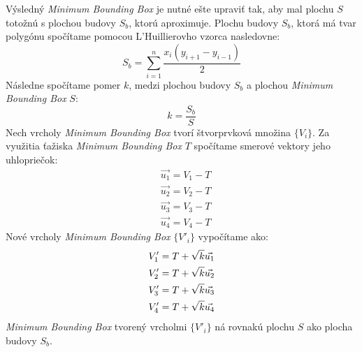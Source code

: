 \documentclass[11pt]{article}
\begin{document}
Výsledný \textit{Minimum Bounding Box} je nutné ešte upraviť tak, aby mal plochu $S$ totožnú s plochou budovy $S_b$, ktorú aproximuje. Plochu budovy $S_b$, ktorá má tvar polygónu spočítame pomocou L'Huillierovho vzorca nasledovne:
\begin{equation*}
S_b = \sum_{i=1}^{n} \frac{x_i(y_{i+1}-y_{i-1})}{2}
\end{equation*}
Následne spočítame pomer $k$, medzi plochou budovy $S_b$ a plochou \textit{Minimum Bounding Box} $S$:
\begin{equation*}
k = \frac{S_b}{S} 
\end{equation*}
Nech vrcholy \textit{Minimum Bounding Box} tvorí štvorprvková množina $\{V_i\}$. Za využitia ťažiska \textit{Minimum Bounding Box} $T$ spočítame smerové vektory jeho uhlopriečok:
\begin{align}
    \nonumber &\vec{u_1} = V_1 - T\\
    \nonumber &\vec{u_2} = V_2 - T\\
    \nonumber &\vec{u_3} = V_3 - T\\
    \nonumber &\vec{u_4} = V_4 - T
\end{align}
Nové vrcholy \textit{Minimum Bounding Box} $\{V'_i\}$ vypočítame ako:
\begin{align}
    \centering
    \nonumber &V'_1 = T + \sqrt{k} \vec{u_1}\\
    \nonumber &V'_2 = T + \sqrt{k} \vec{u_2}\\
    \nonumber &V'_3 = T + \sqrt{k} \vec{u_3}\\
    \nonumber &V'_4 = T + \sqrt{k} \vec{u_4}
\end{align}
\textit{Minimum Bounding Box} tvorený vrcholmi $\{V'_i\}$ ná rovnakú plochu $S$ ako plocha budovy $S_b$.
\end{document}

